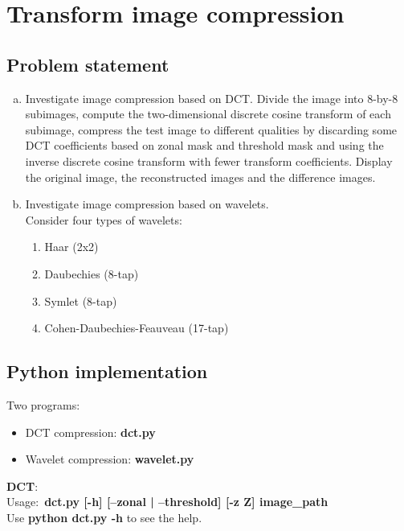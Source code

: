 \chapter{Transform image compression}

\section{Problem statement}

\begin{enumerate}[(a)]
    \item Investigate image compression based on DCT.
          Divide the image into 8-by-8 subimages, compute the two-dimensional discrete cosine
          transform of each subimage, compress the test image to different qualities by
          discarding some DCT coefficients based on zonal mask
          and threshold mask and using the inverse discrete cosine
          transform with fewer transform coefficients. Display the
          original image, the reconstructed images and the
          difference images.

    \item Investigate image compression based on wavelets. \\
          Consider four types of wavelets:
          \begin{enumerate}
            \item Haar (2x2)
            \item Daubechies (8-tap)
            \item Symlet (8-tap)
            \item Cohen-Daubechies-Feauveau (17-tap)
          \end{enumerate}
\end{enumerate}

\section{Python implementation}
\bigskip
Two programs: \\
\begin{itemize}
    \item DCT compression: \textbf{dct.py}
    \item Wavelet compression: \textbf{wavelet.py}
\end{itemize}

\textbf{DCT}: \\
Usage:~\textbf{dct.py [-h] [--zonal | --threshold] [-z Z] image\_path} \\
Use \textbf{python dct.py -h} to see the help.

